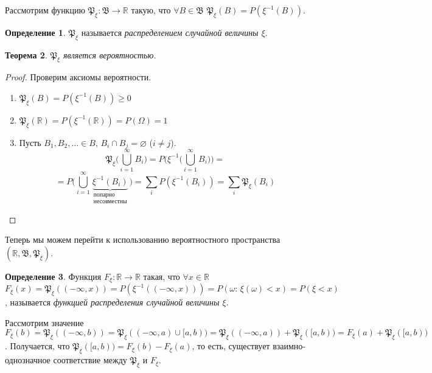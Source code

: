\documentclass[11pt,openany,a4paper]{scrartcl}
\theoremstyle{plain}
\newtheorem{theorem}{Теорема}[subsection]
\theoremstyle{definition}
\newtheorem{definition}[theorem]{Определение}
\newcommand\mb{\mathbb}
\newcommand\real{\mb R}
\newcommand{\distr}{\mathfrak P_\xi}
\newcommand{\funcdistr}{F_\xi}
\begin{document}
Рассмотрим функцию $\mathfrak P_\xi: \mathfrak B \to \real$ такую, что
$\forall B \in \mathfrak B$ $\mathfrak P_\xi(B) = P(\xi^{-1}(B))$.

\begin{definition}
    $\mathfrak P_\xi$ называется \emph{распределением случайной величины $\xi$}.
\end{definition}
\begin{theorem}
    $\mathfrak P_\xi$ является вероятностью.
\end{theorem}
\begin{proof}
    Проверим аксиомы вероятности.
    \begin{enumerate}
        \item $\distr(B) = P(\xi^{-1}(B)) \geqslant 0$
        \item $\distr (\real) =P(\xi^{-1}(\real)) = P(\Omega) = 1$
        \item Пусть $B_1, B_2, \ldots \in B$, $B_i \cap B_j = \varnothing$
        ($i \neq j$).
        $$
        \distr \bigg(\bigcup\limits_{i=1}^\infty B_i\bigg) =
        P\bigg(\xi^{-1}\bigg(\bigcup\limits_{i=1}^\infty B_i\bigg)\bigg) =
        $$
        $$
        = P\bigg(\bigcup\limits_{i=1}^\infty \underbrace{\xi^{-1}
        (B_i)}_{\substack{\text{попарно}\\\text{несовместны}}}\bigg) =
        \sum\limits_i P(\xi^{-1}(B_i)) = \sum\limits_i \distr (B_i)
        $$
    \end{enumerate}
\end{proof}

Теперь мы можем перейти к использованию вероятностного пространства
$(\real, \mathfrak B, \distr)$.

\begin{definition}
    Функция $\funcdistr: \real \to \real$ такая, что
    $\forall x\in \real$ $\funcdistr(x) = \distr((-\infty, x)) = 
    P(\xi^{-1}((-\infty, x))) = P(\omega:\, \xi(\omega) < x) = P(\xi < x)$,
    называется \emph{функцией распределения случайной величины $\xi$}.
\end{definition}

Рассмотрим значение $\funcdistr(b) = \distr((-\infty, b)) =
\distr((-\infty, a) \cup [a, b)) = \distr((-\infty,a)) + \distr([a, b)) =
\funcdistr(a) + \distr([a, b))$. Получается, что
$\distr([a, b)) = \funcdistr(b) - \funcdistr(a)$, то есть,
существует взаимно-однозначное соответствие между $\distr$ и $\funcdistr$.
\end{document}
